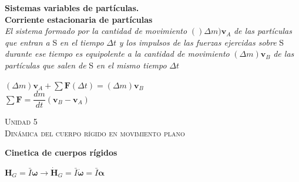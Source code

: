 \documentclass[11pt,a4paper,twocolumn]{article}
\newcommand{\unidad}[2]{\begin{center}
		\fontsize{10}{10}\selectfont\color{gray!50!black}\scshape Unidad #1 \\
		\fontsize{14}{14}\selectfont \scshape #2
		
\end{center}}
\newcommand{\vc}[1]{\textbf{#1}}
\newcommand{\vcs}[1]{\boldsymbol{#1}}
\begin{document}
	
	\textbf{Sistemas variables de partículas.\\
		 Corriente estacionaria de partículas}\\
	\textit{El sistema formado por la cantidad de movimiento} $()\Delta m) \vc{v}_{A}$ \textit{de las partículas que entran a} S \textit{en el tiempo } $\Delta t$ \textit{y los impulsos de las fuerzas ejercidas sobre} S \textit{durante ese tiempo es equipolente a la cantidad de movimiento} $(\Delta m) \vc{v}_{B}$ \textit{de las partículas que salen de} S \textit{en el mismo tiempo} $\Delta t$\\

	\begin{center}
		$(\Delta m) \vc{v}_{A}+\sum \vc{F} (\Delta t) =(\Delta m) \vc{v}_{B}$\\
		\vspace{0.3cm}
		$\sum \vc{F} =\dfrac{dm}{dt} (\vc{v}_{B}-\vc{v}_{A})$\\
	\end{center}

	\unidad{5}{Dinámica del cuerpo rígido en movimiento plano}
	\textbf{Cinetica de cuerpos rígidos}
	\begin{center}
	$ {\vc{H}}_{G}=\bar{I}\vcs{\omega} \rightarrow  \dot{\vc{H}}_{G}=\bar{I}\vcs{\dot{\omega}}=\bar{I}\vcs{\alpha}$
	\end{center}
\end{document}
